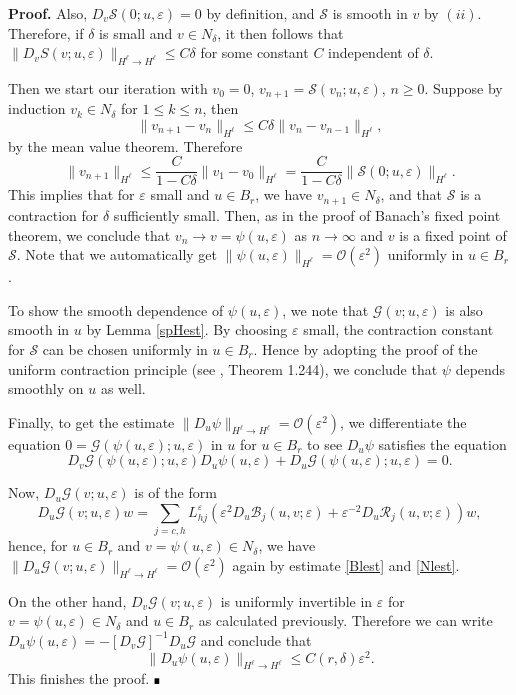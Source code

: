 \documentclass[letterpaper,11pt]{article}
\newcommand{\rmO}{\mathcal{O}}
\newcommand{\eps}{\varepsilon}
\newcommand{\Rm}{\mathcal{R}}
\newcommand{\G}{\mathcal{G}}
\newcommand{\cS}{\mathcal{S}}
\numberwithin{equation}{section}
\theoremstyle{plain}
\theoremstyle{remark}
\newenvironment{Proof}[1][.]%
 {\begin{trivlist}\item[]\textbf{Proof#1 }}%
 {\hspace*{\fill}$\rule{0.3\baselineskip}{0.35\baselineskip}$\end{trivlist}}
\begin{document}
\begin{Proof}
Also, $D_v\cS(0;u,\eps) = 0$ by definition, and $\cS$ is smooth in $v$ by $(ii)$. Therefore, if $\delta$ is small and $v\in N_\delta$, it then follows that $\|D_vS(v;u,\eps)\|_{H^\ell \to H^\ell} \le C\delta$ for some constant $C$ independent of $\delta$.

Then we start our iteration with $v_0 = 0$, $v_{n+1} = \cS(v_n;u,\eps)$, $n\ge 0$. Suppose by induction $v_k \in N_\delta$ for $1\le k \le n$, then
\[
\|v_{n+1}-v_n\|_{H^\ell} \le C\delta\|v_n-v_{n-1}\|_{H^\ell},
\]
by the mean value theorem. Therefore
\[
\|v_{n+1}\|_{H^\ell} \le \frac{C}{1-C\delta}\|v_1-v_0\|_{H^\ell} = \frac{C}{1-C\delta}\|\cS(0;u,\eps)\|_{H^\ell}.
\]
This implies that for $\eps$ small and $u \in B_r$, we have $v_{n+1} \in N_\delta$, and that $\cS$ is a contraction for $\delta$ sufficiently small. Then, as in the proof of Banach's fixed point theorem, we conclude that $v_n \to v = \psi(u,\eps)$ as $n\to \infty$ and $v$ is a fixed point of $\cS$. Note that we automatically get $\|\psi(u,\eps)\|_{H^\ell} = \rmO(\eps^2)$ uniformly in $u\in B_r$. 

To show the smooth dependence of $\psi(u,\eps)$, we note that $\G(v;u,\eps)$ is also smooth in $u$ by Lemma \ref{spHest}. By choosing $\eps$ small, the contraction constant for $\cS$ can be chosen uniformly in $u \in B_r$. Hence by adopting the proof of the uniform contraction principle (see \cite{chicone2006ordinary}, Theorem 1.244), we conclude that $\psi$ depends smoothly on $u$ as well.

Finally, to get the estimate $\|D_u\psi\|_{H^\ell \to H^\ell} = \rmO(\eps^2)$, we differentiate the equation $0 = \G(\psi(u,\eps);u,\eps)$ in $u$ for $u\in B_r$ to see $D_u\psi$ satisfies the equation
\[
D_v\G(\psi(u,\eps); u,\eps)  D_u\psi(u,\eps) + D_u\G(\psi(u,\eps);u,\eps) = 0.
\]

Now, $D_u\G(v;u,\eps)$ is of the form
\[
D_u\G(v;u,\eps) w =  \sum_{j=c,h} L_{hj}^\eps (\eps^2 D_u \mathcal{B}_j(u,v;\eps) + \eps^{-2} D_u\Rm_j(u,v;\eps) ) w,
\]
hence, for $u \in B_r$ and $v=\psi(u,\eps) \in N_\delta$, we have $\|D_u\G(v;u,\eps)\|_{H^\ell \to H^\ell} = \rmO(\eps^2)$ again by estimate \eqref{Blest} and \eqref{Nlest}.

On the other hand, $D_v\G(v;u,\eps)$ is uniformly invertible in $\eps$ for $v=\psi(u,\eps)\in N_\delta$ and $u\in B_r$ as calculated previously. Therefore we can write $D_u\psi(u,\eps) = -[D_v\G]^{-1} D_u\G $ and conclude that 
\[
\|D_u\psi(u,\eps)\|_{H^\ell \to H^\ell} \le C(r,\delta)\eps^2.
\] This finishes the proof.
\end{Proof}
\end{document}
